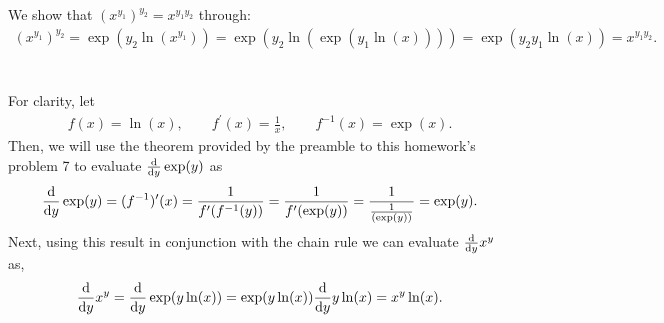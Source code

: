 \documentclass[12 pt,letterpaper]{article}
\begin{document}
\section{}
We show that \((x^{y_1})^{y_2} = x^{y_1 y_2}\) through:
\begin{align*}
    (x^{y_1})^{y_2}
    = \exp(y_2 \ln(x^{y_1}))
    = \exp(y_2 \ln( \exp(y_1 \ln(x)) ))
    = \exp(y_2 y_1 \ln(x) )
    = x^{y_1 y_2}.
\end{align*}

\clearpage
\section{}
For clarity, let
\begin{align*}
    f(x)        = \ln(x), \qquad
    f^\prime(x) = \frac{1}{x}, \qquad
    f^{-1}(x)   = \exp(x) .
\end{align*}
Then, we will use the theorem provided by the preamble to
this homework's problem 7 to evaluate \(\dv{y} \exp(y)\) as
\begin{align*}
    \dv{y} \exp(y)
    = (f^{-1})^\prime(x)
    = \frac{1}{f^\prime(f^{-1}(y))}
    = \frac{1}{f^\prime(\exp(y))}
    = \frac{1}{\frac{1}{(\exp(y))}}
    = \exp(y).
\end{align*}
Next, using this result in conjunction with the chain rule
we can evaluate \(\dv{y} x^y\) as,
\begin{align*}
    \dv{y} x^y
    = \dv{y} \exp(y\ln(x))
    = \exp(y\ln(x)) \dv{y} y\ln(x)
    = x^y \ln(x).
\end{align*}
\end{document}
